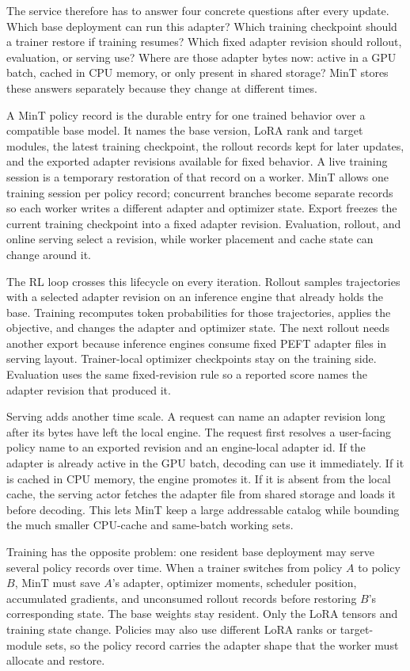 \documentclass{llmxive}
\begin{document}
The service therefore has to answer four concrete questions after every update. Which base deployment can run this adapter? Which training checkpoint should a trainer restore if training resumes? Which fixed adapter revision should rollout, evaluation, or serving use? Where are those adapter bytes now: active in a GPU batch, cached in CPU memory, or only present in shared storage? MinT stores these answers separately because they change at different times.

A MinT policy record is the durable entry for one trained behavior over a compatible base model. It names the base version, LoRA rank and target modules, the latest training checkpoint, the rollout records kept for later updates, and the exported adapter revisions available for fixed behavior. A live training session is a temporary restoration of that record on a worker. MinT allows one training session per policy record; concurrent branches become separate records so each worker writes a different adapter and optimizer state. Export freezes the current training checkpoint into a fixed adapter revision. Evaluation, rollout, and online serving select a revision, while worker placement and cache state can change around it.

The RL loop crosses this lifecycle on every iteration. Rollout samples trajectories with a selected adapter revision on an inference engine that already holds the base. Training recomputes token probabilities for those trajectories, applies the objective, and changes the adapter and optimizer state. The next rollout needs another export because inference engines consume fixed PEFT adapter files in serving layout. Trainer-local optimizer checkpoints stay on the training side. Evaluation uses the same fixed-revision rule so a reported score names the adapter revision that produced it.

Serving adds another time scale. A request can name an adapter revision long after its bytes have left the local engine. The request first resolves a user-facing policy name to an exported revision and an engine-local adapter id. If the adapter is already active in the GPU batch, decoding can use it immediately. If it is cached in CPU memory, the engine promotes it. If it is absent from the local cache, the serving actor fetches the adapter file from shared storage and loads it before decoding. This lets MinT keep a large addressable catalog while bounding the much smaller CPU-cache and same-batch working sets.

Training has the opposite problem: one resident base deployment may serve several policy records over time. When a trainer switches from policy $A$ to policy $B$, MinT must save $A$'s adapter, optimizer moments, scheduler position, accumulated gradients, and unconsumed rollout records before restoring $B$'s corresponding state. The base weights stay resident. Only the LoRA tensors and training state change. Policies may also use different LoRA ranks or target-module sets, so the policy record carries the adapter shape that the worker must allocate and restore.
\end{document}
